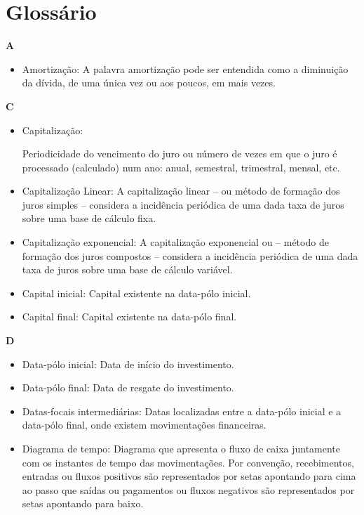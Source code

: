 \chapter{Glossário}

\textbf{A}

\begin{itemize}
\item Amortização:
    A palavra amortização pode ser entendida como a diminuição da dívida, de uma única vez ou aos poucos, em mais vezes. 
\end{itemize}

\textbf{C}
\begin{itemize}
\item Capitalização: 

    Periodicidade do vencimento do juro ou número de vezes em que o juro é processado (calculado) num ano: anual, semestral, trimestral, mensal, etc. 

\item Capitalização Linear:
    A capitalização linear – ou método de formação dos juros simples – considera a incidência periódica de uma dada taxa de juros sobre uma base de cálculo fixa. 

\item Capitalização exponencial:
    A capitalização exponencial ou – método de formação dos juros compostos – considera a incidência periódica de uma dada taxa de juros sobre uma base de cálculo variável. 

\item Capital inicial:
    Capital existente na data-pólo inicial. 

\item Capital final:
    Capital existente na data-pólo final. 

\end{itemize}

\textbf{D}
\begin{itemize}
 \item Data-pólo inicial:
    Data de início do investimento. 

\item Data-pólo final:
    Data de resgate do investimento. 

\item Datas-focais intermediárias:
    Datas localizadas entre a data-pólo inicial e a data-pólo final, onde existem movimentações financeiras. 

\item Diagrama de tempo:
    Diagrama que apresenta o fluxo de caixa juntamente com os instantes de tempo das movimentações. Por convenção, recebimentos, entradas ou fluxos positivos são representados por setas apontando para cima ao passo que saídas ou pagamentos ou fluxos negativos são representados por setas apontando para baixo. 
\end{itemize}

